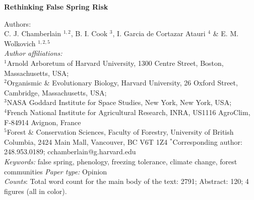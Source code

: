 \documentclass{article}\usepackage[]{graphicx}\usepackage[]{color}
\begin{document}
\noindent \textbf{\Large{Rethinking False Spring Risk}}

\noindent Authors:\\
C. J. Chamberlain $^{1,2}$, B. I. Cook $^{3}$, I. Garcia de Cortazar Atauri $^{4}$ \& E. M. Wolkovich $^{1,2,5}$
\vspace{2ex}\\
\emph{Author affiliations:}\\
$^{1}$Arnold Arboretum of Harvard University, 1300 Centre Street, Boston, Massachusetts, USA; \\
$^{2}$Organismic \& Evolutionary Biology, Harvard University, 26 Oxford Street, Cambridge, Massachusetts, USA; \\
$^{3}$NASA Goddard Institute for Space Studies, New York, New York, USA; \\
$^{4}$French National Institute for Agricultural Research, INRA, US1116 AgroClim, F-84914 Avignon, France\\
$^{5}$Forest \& Conservation Sciences, Faculty of Forestry, University of British Columbia, 2424 Main Mall, Vancouver, BC V6T 1Z4
\vspace{2ex}
$^*$Corresponding author: 248.953.0189; cchamberlain@g.harvard.edu\\

\noindent \emph{Keywords:} false spring, phenology, freezing tolerance, climate change, forest communities
\emph{Paper type:} Opinion\\
\emph{Counts}: Total word count for the main body of the text:  2791; Abstract: 120; 4 figures (all in color). \\

\renewcommand{\thetable}{\arabic{table}}
\renewcommand{\thefigure}{\arabic{figure}}
\renewcommand{\labelitemi}{$-$}


\end{document}
